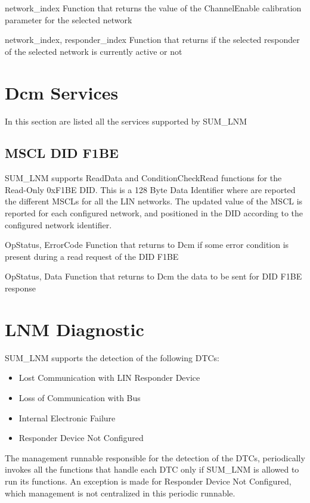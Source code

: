{\code network_index}
{}
{}
{}
{Function that returns the value of the ChannelEnable calibration parameter for the selected network}

{\code network_index, responder_index}
{}
{}
{}
{Function that returns if the selected responder of the selected network is currently active or not}

\section{Dcm Services}
In this section are listed all the services supported by SUM_LNM

\subsection{MSCL DID F1BE}
\label{subsec:MSCL_DID_F1BE}
{
SUM_LNM supports ReadData and ConditionCheckRead functions for the Read-Only 0xF1BE DID. This is a 128 Byte Data Identifier where are reported the different MSCLs for all the LIN networks.
The updated value of the MSCL is reported for each configured network, and positioned in the DID according to the configured network identifier.
}
{     }

{\code OpStatus, ErrorCode}
{}
{}
{}
{Function that returns to Dcm if some error condition is present during a read request of the DID F1BE}

{\code OpStatus, Data}
{}
{}
{}
{Function that returns to Dcm the data to be sent for DID F1BE response}

\section{LNM Diagnostic}
SUM_LNM supports the detection of the following DTCs:
\begin{itemize}
    \item Lost Communication with LIN Responder Device
	\item Loss of Communication with Bus
	\item Internal Electronic Failure
	\item Responder Device Not Configured
\end{itemize}
The management runnable responsible for the detection of the DTCs, periodically invokes all the functions that handle each DTC only if SUM_LNM is allowed to run its functions. 
An exception is made for Responder Device Not Configured, which management is not centralized in this periodic runnable.

